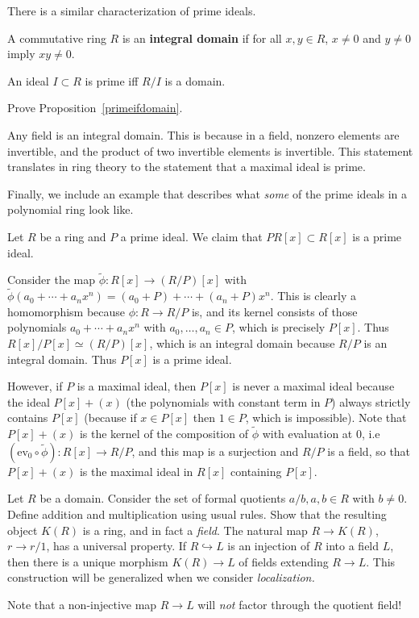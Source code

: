 There is a similar characterization of prime ideals.

\begin{definition} 
A commutative ring $R$ is an \textbf{integral domain} if for all $ x,y \in R$,
$x \neq 0 $ and $y \neq 0$ imply $xy \neq 0$.
\end{definition} 

\begin{proposition}\label{primeifdomain} 
An ideal $I \subset R$ is prime iff $R/I$ is a domain.
\end{proposition} 

\begin{exercise} 
Prove Proposition~\ref{primeifdomain}.
\end{exercise} 

Any field is an integral domain. This is because in a field, nonzero elements
are invertible, and the product of two invertible elements is invertible. This
statement translates in ring theory to the statement that a maximal ideal is
prime.


Finally, we include an example that describes what \emph{some} of the prime
ideals in a polynomial ring look like.
\begin{example} 
Let $R$ be a ring and $P$ a prime ideal. We claim that $PR[x] \subset R[x]$ is a
prime ideal.

Consider the map $\tilde{\phi}:R[x]\rightarrow(R/P)[x]$ with
$\tilde{\phi}(a_0+\cdots+a_nx^n)=(a_0+P)+\cdots+(a_n+P)x^n$. This is clearly
a homomorphism because $\phi:R\rightarrow R/P$ is, and its kernel consists
of those polynomials $a_0+\cdots+a_nx^n$ with $a_0,\ldots,a_n\in P$, which is
precisely $P[x]$. Thus $R[x]/P[x]\simeq (R/P)[x]$, which is an integral domain
because $R/P$ is an integral domain. Thus $P[x]$ is a prime ideal. 

However, if
$P$ is a maximal ideal, then $P[x]$ is never a maximal ideal because the ideal
$P[x]+(x)$ (the polynomials with constant term in $P$) always strictly contains
$P[x]$ (because if $x\in P[x]$ then $1\in P$, which is impossible). Note
that $P[x]+(x)$ is the kernel of the composition of $\tilde{\phi}$ with
evaluation at 0, i.e $(\text{ev}_0\circ\tilde{\phi}):R[x]\rightarrow R/P$,
and this map is a surjection and $R/P$ is a field, so that $P[x]+(x)$ is
the maximal ideal in $R[x]$ containing $P[x]$.
\end{example} 


\begin{exercise} 
Let $R$ be a domain. Consider the set of formal quotients $a/b, a, b \in R$
with $b \neq 0$. Define addition and multiplication using usual rules. Show
that the resulting object $K(R)$ is a ring, and in fact a \emph{field}. The
natural map $R \to K(R)$, $r \to r/1$, has a universal property. If $R
\hookrightarrow L$ is an injection of $R$ into a field $L$, then there is a
unique morphism $K(R) \to L$ of fields extending $R \to L$. This construction
will be generalized when we consider \emph{localization.}

Note that a non-injective map $R\to L$ will \emph{not} factor through the
quotient field!
\end{exercise} 


